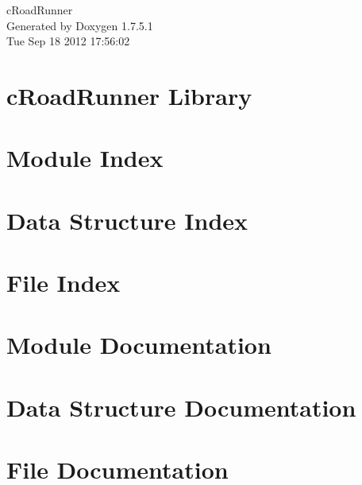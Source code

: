 \documentclass[a4paper]{book}
\begin{document}
\hypersetup{pageanchor=false,citecolor=blue}
\begin{titlepage}
\vspace*{7cm}
\begin{center}
{\Large c\-Road\-Runner }\\
\vspace*{1cm}
{\large \-Generated by Doxygen 1.7.5.1}\\
\vspace*{0.5cm}
{\small Tue Sep 18 2012 17:56:02}\\
\end{center}
\end{titlepage}
\clearemptydoublepage
{}
\tableofcontents
\clearemptydoublepage
{}
\hypersetup{pageanchor=true,citecolor=blue}
\chapter{c\-Road\-Runner \-Library}
\label{index}\hypertarget{index}{}
\chapter{\-Module \-Index}

\chapter{\-Data \-Structure \-Index}

\chapter{\-File \-Index}

\chapter{\-Module \-Documentation}




















\chapter{\-Data \-Structure \-Documentation}







\chapter{\-File \-Documentation}




\printindex
\end{document}
